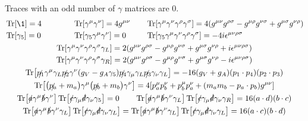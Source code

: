 Traces with an odd number of $\gamma$ matrices are $0$.
\begin{gather*}
        \begin{alignedat}{3}
                &\Tr[\1] = 4
                \qquad
                \qquad
                &&\Tr[\gamma^\mu\gamma^\nu] = 4g^{\mu\nu}
                \qquad
                &&\Tr[\gamma^\mu\gamma^\nu\gamma^\rho\gamma^\sigma] = 4\qty(g^{\mu\nu}g^{\rho\sigma} - g^{\mu\rho}g^{\nu\sigma} + g^{\mu\sigma}g^{\nu\rho})
                \\
                &\Tr[\gamma_5] = 0
                \qquad
                \qquad
                &&\Tr[\gamma_5\gamma^\mu\gamma^\nu] = 0
                \qquad
                &&\Tr[\gamma_5\gamma^\mu\gamma^\nu\gamma^\rho\gamma^\sigma] = -4i\epsilon^{\mu\nu\rho\sigma}
        \end{alignedat}
        \\
        \Tr[\gamma^\mu\gamma^\nu\gamma^\rho\gamma^\sigma\gamma_L] = 2\qty(g^{\mu\nu}g^{\rho\sigma} - g^{\mu\rho}g^{\nu\sigma} + g^{\mu\sigma}g^{\nu\rho} + i\epsilon^{\mu\nu\rho\sigma})
        \\
        \Tr[\gamma^\mu\gamma^\nu\gamma^\rho\gamma^\sigma\gamma_R] = 2\qty(g^{\mu\nu}g^{\rho\sigma} - g^{\mu\rho}g^{\nu\sigma} + g^{\mu\sigma}g^{\nu\rho} - i\epsilon^{\mu\nu\rho\sigma})
        \\
        \Tr[\slashed{p_1}\gamma^\mu\gamma_L\slashed{p_2}\gamma^\nu\qty(g_V-g_A\gamma_5)\slashed{p_4}\gamma_\mu\gamma_L\slashed{p_3}\gamma_\nu\gamma_L]
        = -16\qty(g_V + g_A)\qty(p_1\cdot p_4)\qty(p_2\cdot p_3)
        \\
        \Tr[\qty(\slashed{p_a}+m_a)\gamma^\mu\qty(\slashed{p_b}+m_b)\gamma^\nu]
        = 4\qty[p_a^{\mu}p_b^{\nu} + p_b^{\mu}p_a^{\nu} + \qty(m_am_b - p_a\cdot p_b)g^{\mu\nu}]
        \\
        \Tr[\slashed{a}\gamma^\mu\slashed{b}\gamma^\nu]\Tr[\slashed{c}\gamma_\mu\slashed{d}\gamma_\nu\gamma_5] = 0
        \qquad
        \Tr[\slashed{a}\gamma^\mu\slashed{b}\gamma^\nu\gamma_L]\Tr[\slashed{c}\gamma_\mu\slashed{d}\gamma_\nu\gamma_R] = 16\qty(a\cdot d)\qty(b\cdot c)
        \\
        \Tr[\slashed{a}\gamma^\mu\slashed{b}\gamma^\nu\gamma_L]\Tr[\slashed{c}\gamma_\mu\slashed{d}\gamma_\nu\gamma_L]
        =
        \Tr[\slashed{a}\gamma^\mu\slashed{b}\gamma^\nu\gamma_L]\Tr[\slashed{c}\gamma_\mu\slashed{d}\gamma_\nu\gamma_L]
        = 16\qty(a\cdot c)\qty(b\cdot d)
\end{gather*}
